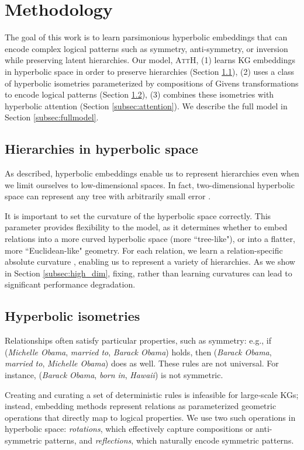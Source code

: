 \documentclass[11pt,a4paper]{article}
\newcommand{\model}[1]{\textsc{AttH}}
\begin{document}
\section{Methodology} 
The goal of this work is to learn parsimonious hyperbolic embeddings that can encode complex logical patterns such as symmetry, anti-symmetry, or inversion while preserving latent hierarchies. 
Our model, \model{}, (1) learns KG embeddings in hyperbolic space in order to preserve hierarchies (Section \ref{subsec:hypmodel}), (2) uses a class of hyperbolic isometries parameterized by compositions of Givens transformations to encode logical patterns (Section \ref{subsec:isom}), (3) combines these isometries with hyperbolic attention (Section \ref{subsec:attention}). 
We describe the full model in Section \ref{subsec:fullmodel}.
 
\subsection{Hierarchies in hyperbolic space} \label{subsec:hypmodel}
As described, hyperbolic embeddings enable us to represent hierarchies even when we limit ourselves to low-dimensional spaces. 
In fact, two-dimensional hyperbolic space can represent any tree with arbitrarily small error \cite{sala2018representation}.

It is important to set the curvature of the hyperbolic space correctly. 
This parameter provides flexibility to the model, as it determines whether to embed relations into a more curved hyperbolic space (more ``tree-like"), or into a flatter, more ``Euclidean-like" geometry. 
For each relation, we learn a relation-specific absolute curvature , enabling us to represent a variety of hierarchies. 
As we show in Section \ref{subsec:high_dim}, fixing, rather than learning curvatures can lead to significant performance degradation. 
\subsection{Hyperbolic isometries}\label{subsec:isom}
Relationships often satisfy particular properties, such as symmetry: e.g., if (\textit{Michelle Obama}, \textit{married to}, \textit{Barack Obama}) holds, then (\textit{Barack Obama}, \textit{married to}, \textit{Michelle Obama}) does as well. 
These rules are not universal. For instance, (\textit{Barack Obama}, \textit{born in}, \textit{Hawaii}) is not symmetric.

Creating and curating a set of deterministic rules is infeasible for large-scale KGs; instead, embedding methods represent relations as parameterized geometric operations that directly map to logical properties. We use two such operations in hyperbolic space: \emph{rotations}, which effectively capture compositions or anti-symmetric patterns, and \emph{reflections}, which naturally encode symmetric patterns.
\end{document}
